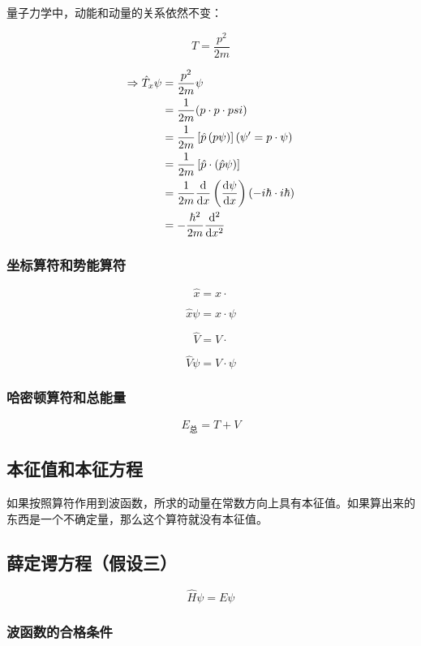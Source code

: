 量子力学中，动能和动量的关系依然不变：

\[
    T = \frac{p^2}{2m}  
\]

\begin{align*}
    \Rightarrow \hat{T}_x \psi &= \frac{p^2}{2m} \psi  \\
    &= \frac{1}{2m}(p \cdot p \cdot psi) \\ 
    &= \frac{1}{2m} \left[\hat{p} \left( p \psi \right) \right] \left(
        \psi ' = p \cdot \psi
     \right) \\ 
    &= \frac{1}{2m} \left[ \hat{p} \cdot \left(
        \hat{p} \psi
     \right) \right] \\
    &= \frac{1}{2m} \frac{\mathrm{d}}{\mathrm{d} x} \left( \frac{\mathrm{d} \psi}{\mathrm{d} x} \right) \left( -i \hbar \cdot i \hbar \right) \\
    &= - \frac{\hbar^2}{2m} \frac{\mathrm{d} ^2}{\mathrm{d} x^2}
\end{align*}

\subsubsection{坐标算符和势能算符}

\[
    \hat{x} = x \cdot  
\]

\[
    \hat{x} \psi = x \cdot \psi  
\]

\[
    \hat{V} = V \cdot   
\]

\[
    \hat{V} \psi = V \cdot \psi  
\]


\subsubsection{哈密顿算符和总能量}

\[
    E_{\mbox{总}} = T + V  
\]

\subsection{本征值和本征方程}

如果按照算符作用到波函数，所求的动量在常数方向上具有本征值。如果算出来的东西是一个不确定量，那么这个算符就没有本征值。

\subsection{薛定谔方程（假设三）}

\[
    \hat{H} \psi = E \psi  
\]

\subsubsection{波函数的合格条件}

